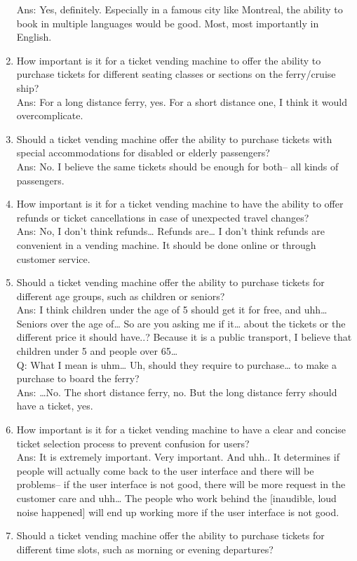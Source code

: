 \begin{enumerate}
Ans: Yes, definitely. Especially in a famous city like Montreal, the ability to book in multiple languages would be good. Most, most importantly in English.
    \item How important is it for a ticket vending machine to offer the ability to purchase tickets for different seating classes or sections on the ferry/cruise ship?\\
Ans: For a long distance ferry, yes. For a short distance one, I think it would overcomplicate.
    \item Should a ticket vending machine offer the ability to purchase tickets with special accommodations for disabled or elderly passengers?\\
Ans: No. I believe the same tickets should be enough for both-- all kinds of passengers.
    \item How important is it for a ticket vending machine to have the ability to offer refunds or ticket cancellations in case of unexpected travel changes?\\
Ans: No, I don’t think refunds… Refunds are… I don’t think refunds are convenient in a vending machine. It should be done online or through customer service.
    \item Should a ticket vending machine offer the ability to purchase tickets for different age groups, such as children or seniors?\\
Ans: I think children under the age of 5 should get it for free, and uhh… Seniors over the age of… So are you asking me if it… about the tickets or the different price it should have..? Because it is a public transport, I believe that children under 5 and people over 65…\\
Q: What I mean is uhm… Uh, should they require to purchase… to make a purchase to board the ferry?\\
Ans: …No. The short distance ferry, no. But the long distance ferry should have a ticket, yes.
    \item How important is it for a ticket vending machine to have a clear and concise ticket selection process to prevent confusion for users?\\
Ans: It is extremely important. Very important. And uhh.. It determines if people will actually come back to the user interface and there will be problems-- if the user interface is not good, there will be more request in the customer care and uhh… The people who work behind the [inaudible, loud noise happened] will end up working more if the user interface is not good.
    \item Should a ticket vending machine offer the ability to purchase tickets for different time slots, such as morning or evening departures?\\

\end{enumerate}
